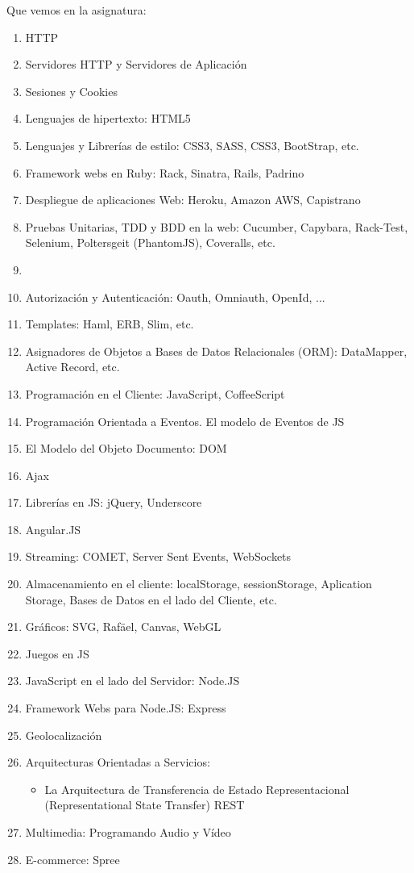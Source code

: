 \documentclass[11pt,a4paper]{article}
\begin{document}
Que vemos en la asignatura:

\begin{enumerate}
\item HTTP
\item Servidores HTTP y Servidores de Aplicación
\item Sesiones y Cookies
\item Lenguajes de hipertexto: HTML5
\item Lenguajes y Librerías de estilo: CSS3, SASS, CSS3, BootStrap, etc.
\item Framework webs en Ruby: Rack, Sinatra, Rails, Padrino
\item Despliegue de aplicaciones Web: Heroku, Amazon AWS, Capistrano
\item Pruebas Unitarias, TDD y BDD en la web: Cucumber, Capybara, Rack-Test, Selenium, Poltersgeit (PhantomJS), Coveralls, etc.
  \item
\item Autorización y Autenticación: Oauth, Omniauth, OpenId, ...
\item Templates: Haml, ERB, Slim, etc.
\item Asignadores de Objetos a Bases de Datos Relacionales (ORM): DataMapper, Active Record, etc.
\item Programación en el Cliente: JavaScript, CoffeeScript
\item Programación Orientada a Eventos. El modelo de Eventos de JS
\item El Modelo del Objeto Documento: DOM
\item Ajax 
\item Librerías en JS: jQuery, Underscore
\item Angular.JS
\item Streaming: COMET, Server Sent Events, WebSockets
\item Almacenamiento en el cliente: localStorage, sessionStorage, Aplication Storage, Bases de Datos en el lado del Cliente, etc.
\item Gráficos: SVG, Rafäel, Canvas, WebGL
\item Juegos en JS
\item JavaScript en el lado del Servidor: Node.JS
\item Framework Webs para Node.JS: Express
\item Geolocalización
\item Arquitecturas Orientadas a Servicios:
  \begin{itemize}
  \item La Arquitectura  de Transferencia de Estado Representacional (Representational State Transfer) REST
  \end{itemize}
\item Multimedia: Programando Audio y Vídeo
\item E-commerce: Spree
\end{enumerate}
\end{document}
